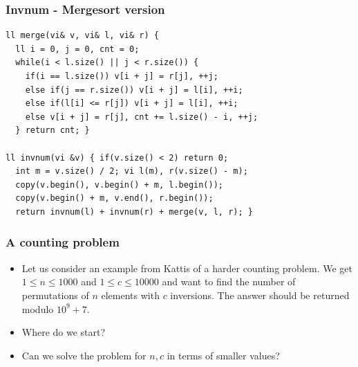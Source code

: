 \documentclass{beamer}
\begin{document}
\begin{frame}
\frametitle{Invnum - Mergesort version}

\begin{small}
\begin{verbatim}
ll merge(vi& v, vi& l, vi& r) {
  ll i = 0, j = 0, cnt = 0;
  while(i < l.size() || j < r.size()) {
    if(i == l.size()) v[i + j] = r[j], ++j;
    else if(j == r.size()) v[i + j] = l[i], ++i;
    else if(l[i] <= r[j]) v[i + j] = l[i], ++i;
    else v[i + j] = r[j], cnt += l.size() - i, ++j;
  } return cnt; }

ll invnum(vi &v) { if(v.size() < 2) return 0;
  int m = v.size() / 2; vi l(m), r(v.size() - m);
  copy(v.begin(), v.begin() + m, l.begin());
  copy(v.begin() + m, v.end(), r.begin());
  return invnum(l) + invnum(r) + merge(v, l, r); }
\end{verbatim}
\end{small}

\end{frame}

\begin{frame}[plain]
\frametitle{A counting problem}

\begin{itemize}

\item Let us consider an example from Kattis of a harder counting problem. We get $1 \leq n \leq 1000$ and $1 \leq c \leq 10000$ and want to find the number of permutations of $n$ elements with $c$ inversions. The answer should be returned modulo $10^9 + 7$.

\item Where do we start?

\item Can we solve the problem for $n, c$ in terms of smaller values?

\end{itemize}

\end{frame}
\end{document}
